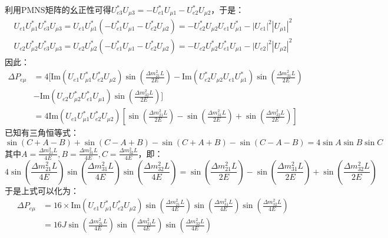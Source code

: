 \documentclass{article}
\begin{document}
	利用PMNS矩阵的幺正性可得$U_{e3}^\ast U_{\mu3}=-U_{e1}^\ast U_{\mu1}-U_{e2}^\ast U_{\mu2}$，于是：
	\begin{gather*}
		U_{e1}U_{\mu1}^\ast U_{e3}^\ast U_{\mu3}=U_{e1}U_{\mu1}^\ast(-U_{e1}^\ast U_{\mu1}-U_{e2}^\ast U_{\mu2})=-U_{e2}^*U_{\mu2} U_{e1} U_{\mu1}^*-|U_{e1}|^2|U_{\mu1}|^2 \\
		U_{e2}U_{\mu2}^\ast U_{e3}^\ast U_{\mu3}=U_{e2}U_{\mu2}^\ast(-U_{e1}^\ast U_{\mu1}-U_{e2}^\ast U_{\mu2})=-U_{e2}U_{\mu2}^\ast U_{e1}^\ast U_{\mu1}-|U_{e2}|^2|U_{\mu2}|^2
	\end{gather*}
	因此：
	\begin{equation*}
		\begin{aligned}
			\Delta P_{e\mu}&=4\Bigg[\mathrm{Im}(U_{e1}U_{\mu1}^\ast U_{e2}^\ast U_{\mu2})\sin\left(\frac{\Delta m_{21}^2L}{2E}\right)-\mathrm{Im}(U_{e2}^*U_{\mu2} U_{e1} U_{\mu1}^*)\sin\left(\frac{\Delta m_{31}^2L}{2E}\right)\\
				&-\mathrm{Im}(U_{e2}U_{\mu2}^\ast U_{e1}^\ast U_{\mu1})\sin\left(\frac{\Delta m_{32}^2L}{2E}\right)\Bigg]\\
				&=4\mathrm{Im}(U_{e1}U_{\mu1}^\ast U_{e2}^\ast U_{\mu2})\left[\sin\left(\frac{\Delta m_{21}^2L}{2E}\right)-\sin\left(\frac{\Delta m_{31}^2L}{2E}\right)+\sin\left(\frac{\Delta m_{32}^2L}{2E}\right)\right]
		\end{aligned}
	\end{equation*}
	已知有三角恒等式：
	\begin{equation*}
		\sin(C+A-B)+\sin(C-A+B)-\sin(C+A+B)-\sin(C-A-B)=4\sin A\sin B\sin C
	\end{equation*}
	其中$A=\frac{\Delta m_{21}^2L}{4E},B=\frac{\Delta m_{31}^2L}{4E},C=\frac{\Delta m_{32}^2L}{4E}$，即：
	\begin{equation*}
		4\sin\left(\frac{\Delta m_{21}^2L}{4E}\right)\sin\left(\frac{\Delta m_{31}^2L}{4E}\right)\sin\left(\frac{\Delta m_{32}^2L}{4E}\right)=\sin\left(\frac{\Delta m_{21}^2L}{2E}\right)-\sin\left(\frac{\Delta m_{31}^2L}{2E}\right)+\sin\left(\frac{\Delta m_{32}^2L}{2E}\right)
	\end{equation*}
	于是上式可以化为：
	\begin{equation*}
		\begin{aligned}
			\Delta P_{e\mu}&=16\times\mathrm{Im}(U_{e1}U_{\mu1}^\ast U_{e2}^\ast U_{\mu2})\sin\left(\frac{\Delta m_{21}^2L}{4E}\right)\sin\left(\frac{\Delta m_{31}^2L}{4E}\right)\sin\left(\frac{\Delta m_{32}^2L}{4E}\right)\\
		&=16J\sin\left(\frac{\Delta m_{21}^2L}{4E}\right)\sin\left(\frac{\Delta m_{31}^2L}{4E}\right)\sin\left(\frac{\Delta m_{32}^2L}{4E}\right)
		\end{aligned}
	\end{equation*}
\end{document}
